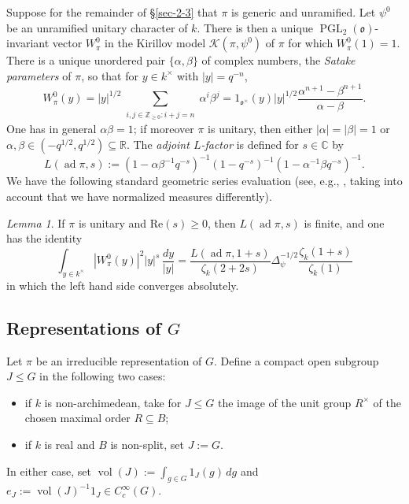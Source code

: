 \documentclass[reqno,10pt]{amsart}
\theoremstyle{plain} %
\theoremstyle{definition}
\theoremstyle{plain} %
\theoremstyle{remark}
\theoremstyle{itplain} %
\newtheorem*{lemma*}{Lemma}
\theoremstyle{remark} %
\renewcommand{\Re}{\mathrm{Re}}
\renewcommand{\geq}{\geqslant}
\renewcommand{\leq}{\leqslant}
\numberwithin{equation}{section}
\DeclareMathOperator{\ad}{ad}
\def\PGL{\operatorname{PGL}}
\DeclareMathOperator{\vol}{vol}
\begin{document}
Suppose for the remainder of \S\ref{sec-2-3} that $\pi$ is generic and unramified.  Let $\psi^0$ be an unramified unitary character of $k$.  There is then a unique $\PGL_2(\mathfrak{o})$-invariant vector $W_{\pi}^0$ in the Kirillov model $\mathcal{K}(\pi,\psi^0)$ of $\pi$ for which $W_{\pi}^0(1) = 1$.  There is a unique unordered pair $\{\alpha, \beta \}$ of complex numbers, the \emph{Satake parameters} of $\pi$, so that for $y \in k^\times$ with $|y| = q^{-n}$,
\begin{equation}\label{eq:explicit-formula-W-pi-0}
  W_{\pi}^0(y)
  =
  |y|^{1/2}
  \sum _{\substack{
      i, j \in \mathbb{Z}_{\geq 0}:
      i + j = n
    }
  }
  \alpha^{i} \beta^j
  =
  1_{\mathfrak{o}^\times}(y) |y|^{1/2}
  \frac{\alpha^{n+1} - \beta^{n+1}}{\alpha - \beta }.
\end{equation}
One has in general $\alpha \beta = 1$; if moreover $\pi$ is unitary, then either $|\alpha| = |\beta| = 1$ or $\alpha,\beta \in (-q^{1/2}, q^{1/2}) \subseteq \mathbb{R}$.  The \emph{adjoint $L$-factor} is defined for $s \in \mathbb{C}$ by
\[
  L(\ad \pi,s) := (1 - \alpha \beta^{-1} q^{-s})^{-1} (1 - q^{-s})^{-1} (1 - \alpha^{-1} \beta q^{-s})^{-1}.
\]
We have the following standard geometric series evaluation (see, e.g., \cite[Prop 3.8.1]{MR1431508}, taking into account that we have normalized measures differently).
\begin{lemma*}
  If $\pi$ is unitary and $\Re(s) \geq 0$, then $L(\ad \pi, s)$ is finite, and one has the identity
  \begin{equation}\label{eq:local-computation-norm-of-whittaker-newvector}
    \int_{y \in k^\times}
    |W_{\pi}^0(y)|^2
    |y|^s
    \, \frac{d y}{|y|}
    = \frac{L(\ad \pi,1 + s)}{\zeta_k(2 + 2 s)}
    \Delta_{\psi}^{-1/2}
    \frac{\zeta_k(1 + s)}{\zeta_k(1)}
  \end{equation}
  in which the left hand side converges absolutely.
\end{lemma*}








\subsection{Representations of $G$}
\label{sec-2-4}
Let $\pi$ be an irreducible representation of $G$.  Define a compact open subgroup $J \leq G$ in the following two cases:
\begin{itemize}
\item if $k$ is non-archimedean, take for $J \leq G$ the image of the unit group $R^\times$ of the chosen maximal order $R \subseteq B$;
\item if $k$ is real and $B$ is non-split, set $J := G$.
\end{itemize}
In either case, set $\vol(J) := \int_{g \in G} 1_J(g) \, d g$ and $e_J := \vol(J)^{-1} 1_J \in C_c^\infty(G)$.
\end{document}
